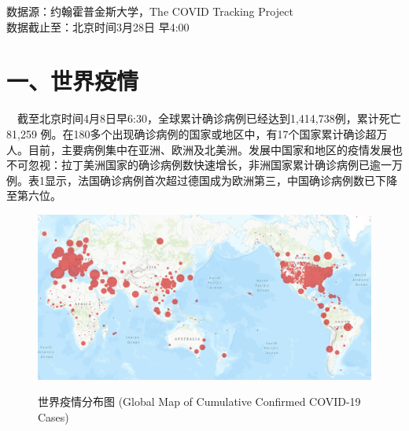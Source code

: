 \documentclass[]{article}
\begin{document}
\begin{Large}
{数据源：约翰霍普金斯大学，The COVID Tracking Project \\ 数据截止至：北京时间3月28日 早4:00}
\end{Large}

\hypertarget{section-2}{%
\section{\texorpdfstring{\textcolor{glaucous}{\Huge 一、世界疫情}}{}}\label{section-2}}

\(\quad\)截至北京时间4月8日早6:30，全球累计确诊病例已经达到1,414,738例，累计死亡81,259
例。在180多个出现确诊病例的国家或地区中，有17个国家累计确诊超万人。目前，主要病例集中在亚洲、欧洲及北美洲。发展中国家和地区的疫情发展也不可忽视：拉丁美洲国家的确诊病例数快速增长，非洲国家累计确诊病例已逾一万例。表1显示，法国确诊病例首次超过德国成为欧洲第三，中国确诊病例数已下降至第六位。

\begin{figure}[H]
\caption{世界疫情分布图 (Global Map of Cumulative Confirmed COVID-19 Cases)} %
\centering
\includegraphics[]{./input/covid1.png} %
\label{} %
\end{figure}
\end{document}
